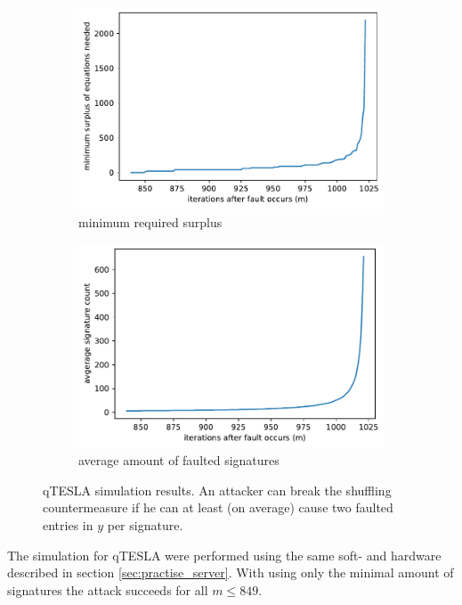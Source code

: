 \documentclass[a4paper,titlepage]{article}
\begin{document}
\begin{figure}[p]
\centering
\begin{subfigure}{.5\textwidth}
  \centering
  
\includegraphics[width=.9\linewidth]{plots/server_qtesla_i_surplus}%
  \caption{minimum required surplus}
  \label{fig:resqteslasurplus}
\end{subfigure}%
\begin{subfigure}{.5\textwidth}
  \centering
\includegraphics[width=.9\linewidth]{plots/server_qtesla_i_sigcount_surplus}%
  \caption{average amount of faulted signatures}
  \label{fig:resqteslasigs}
\end{subfigure}

\caption{qTESLA simulation results. An attacker can break the shuffling countermeasure if he can at least (on average) cause two faulted entries in $y$ per signature.}
\end{figure}


The simulation for qTESLA were performed using the same soft- and hardware described in section \ref{sec:practise_server}.
With using only the minimal amount of signatures the attack succeeds for all $m \leq 849$.
\end{document}
